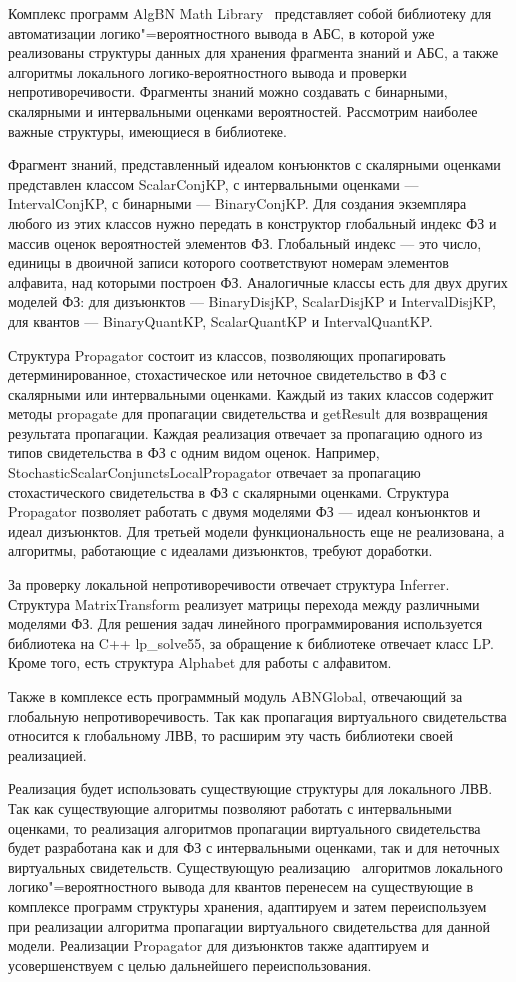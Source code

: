 Комплекс программ AlgBN Math Library~\cite{89} представляет собой библиотеку для автоматизации логико"=вероятностного вывода в АБС, в которой уже реализованы структуры данных для хранения фрагмента знаний и АБС, а также алгоритмы локального логико-вероятностного вывода и проверки непротиворечивости. Фрагменты знаний можно создавать с бинарными, скалярными и интервальными оценками вероятностей. Рассмотрим наиболее важные структуры, имеющиеся в библиотеке.

 Фрагмент знаний, представленный идеалом конъюнктов с скалярными оценками представлен классом ScalarConjKP, с интервальными оценками --- IntervalConjKP, с бинарными --- BinaryConjKP. Для создания экземпляра любого из этих классов нужно передать в конструктор глобальный индекс ФЗ и массив оценок вероятностей элементов ФЗ. Глобальный индекс --- это число, единицы в двоичной записи которого соответствуют номерам элементов алфавита, над которыми построен ФЗ. Аналогичные классы есть для двух других моделей ФЗ: для дизъюнктов --- BinaryDisjKP, ScalarDisjKP и IntervalDisjKP, для квантов --- BinaryQuantKP, ScalarQuantKP и IntervalQuantKP.

Структура Propagator состоит из классов, позволяющих пропагировать детерминированное, стохастическое или неточное свидетельство в ФЗ с скалярными или интервальными оценками. Каждый из таких классов содержит методы propagate для пропагации свидетельства и getResult для возвращения результата пропагации. Каждая реализация отвечает за пропагацию одного из типов свидетельства в ФЗ с одним видом оценок. Например, StochasticScalarConjunctsLocalPropagator отвечает за пропагацию стохастического свидетельства в ФЗ с скалярными оценками. Структура Propagator позволяет работать с двумя моделями ФЗ --- идеал конъюнктов и идеал дизъюнктов. Для третьей модели функциональность еще не реализована, а алгоритмы, работающие с идеалами дизъюнктов, требуют доработки.

За проверку локальной непротиворечивости отвечает структура In\-ferrer. Структура MatrixTransform реализует матрицы перехода между различными моделями ФЗ. Для решения задач линейного программирования используется библиотека на C++ lp\_solve55, за обращение к библиотеке отвечает класс LP. Кроме того, есть структура Alphabet для работы с алфавитом.

Также в комплексе есть программный модуль ABNGlobal, отвечающий за глобальную непротиворечивость. Так как пропагация виртуального свидетельства относится к глобальному ЛВВ, то расширим эту часть библиотеки своей реализацией. 

Реализация будет использовать существующие структуры для локального ЛВВ. Так как существующие алгоритмы позволяют работать с интервальными оценками, то реализация алгоритмов пропагации виртуального свидетельства будет разработана как и для ФЗ с интервальными оценками, так и для неточных виртуальных свидетельств. Существующую реализацию~\cite{4, 65} алгоритмов  локального логико"=вероятностного вывода для квантов перенесем на существующие в комплексе программ структуры хранения, адаптируем и затем переиспользуем при реализации алгоритма пропагации виртуального свидетельства для данной модели. Реализации Propagator для дизъюнктов также адаптируем и усовершенствуем с целью дальнейшего переиспользования.


